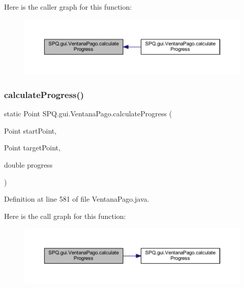 Here is the caller graph for this function\+:
\nopagebreak
\begin{figure}[H]
\begin{center}
\leavevmode
\includegraphics[width=350pt]{class_s_p_q_1_1gui_1_1_ventana_pago_ab3583b9bfd461ce0bede2df8ea8c7bd1_icgraph}
\end{center}
\end{figure}
\mbox{\label{class_s_p_q_1_1gui_1_1_ventana_pago_aebf84331e3789dfd9444704d43ee3104}} 
\subsubsection{\texorpdfstring{calculate\+Progress()}{calculateProgress()}\hspace{0.1cm}{\footnotesize\ttfamily [2/4]}}
{\footnotesize\ttfamily static Point S\+P\+Q.\+gui.\+Ventana\+Pago.\+calculate\+Progress (\begin{DoxyParamCaption}\item[{Point}]{start\+Point,  }\item[{Point}]{target\+Point,  }\item[{double}]{progress }\end{DoxyParamCaption})\hspace{0.3cm}{\ttfamily [static]}}



Definition at line 581 of file Ventana\+Pago.\+java.

Here is the call graph for this function\+:
\nopagebreak
\begin{figure}[H]
\begin{center}
\leavevmode
\includegraphics[width=350pt]{class_s_p_q_1_1gui_1_1_ventana_pago_aebf84331e3789dfd9444704d43ee3104_cgraph}
\end{center}
\end{figure}
\mbox{\label{class_s_p_q_1_1gui_1_1_ventana_pago_aa815284e8b31df848f8801518cf95c95}} 
